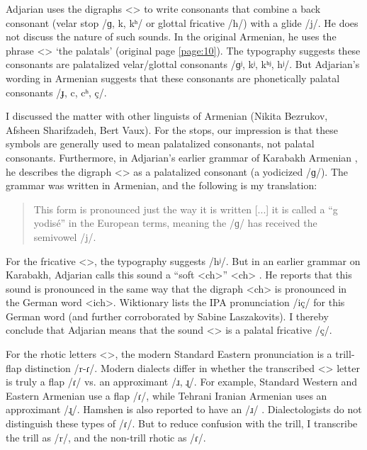 \documentclass[output=paper]{langscibook}
\begin{document}
\label{sec:HossepInro:phonotransc:adj:implicit:palatal}

Adjarian uses the digraphs <> to write consonants that  combine a back consonant  (velar stop /ɡ, k, kʰ/ or glottal fricative /h/) with a glide /j/. He does not discuss the nature of such sounds. In the original Armenian, he uses the phrase <> `the palatals' (original page \ref{page:10}). The typography suggests these consonants are palatalized velar/glottal consonants /ɡʲ, kʲ, kʰʲ, hʲ/. But Adjarian's   wording  in Armenian suggests that these consonants are phonetically palatal consonants  /ɟ, c, cʰ, ç/. 

I discussed the matter with other linguists of Armenian (Nikita Bezrukov, Afsheen Sharifzadeh, Bert Vaux). For the stops, our impression is that these symbols are generally used to mean palatalized consonants, not palatal consonants. Furthermore, in Adjarian's earlier grammar of Karabakh Armenian \citep[18]{Adjarian-1901-Kharabagh}, he describes the digraph <> as a palatalized consonant (a yodicized /ɡ/). The grammar was written in Armenian, and the following is my translation:

\begin{quote}

This form  is pronounced just the way it is written [...] it is called a ``g yodisé'' in the European terms, meaning the /ɡ/ has received the semivowel /j/. 

\end{quote}

For the fricative <>, the typography suggests /hʲ/. But in an earlier grammar on Karabakh, Adjarian  calls this sound a ``soft <ch>''  <ch> \citep[24]{Adjarian-1901-Kharabagh}. He reports that this sound is pronounced in the same way that the digraph <ch> is pronounced in the German word <ich>. Wiktionary lists the IPA pronunciation /iç/ for this German word (and further corroborated by Sabine Laszakovits). I thereby conclude that Adjarian means that the sound <> is a palatal fricative /ç/. 


For the rhotic letters <>, the modern Standard Eastern pronunciation is a trill-flap distinction /r-ɾ/. Modern dialects differ in whether the transcribed <> letter is truly a flap /ɾ/ vs. an approximant /ɹ, ɻ/. For example, Standard Western and Eastern Armenian use a flap /ɾ/, while Tehrani Iranian Armenian uses an approximant /ɻ/. Hamshen is also reported to have an /ɹ/ \citep{Vaux-2007-HomshetsmaBook}. Dialectologists do not distinguish these types of /ɾ/. But to reduce confusion with the trill, I transcribe the trill as /r/, and the non-trill rhotic as /ɾ/. 
\end{document}
